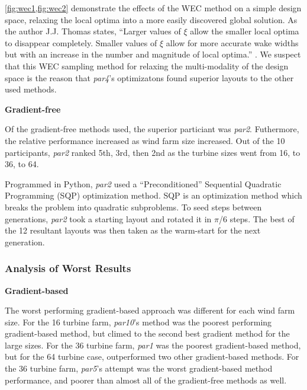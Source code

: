 	\cref{fig:wec1,fig:wec2} demonstrate the effects of the WEC method on a simple design space, relaxing the local optima into a more easily discovered global solution.
	As the author J.J. Thomas states, ``Larger values of $\xi$ allow the smaller local optima to disappear completely.
	Smaller values of $\xi$ allow for more accurate wake widths but with an increase in the number and magnitude of local optima.'' \cite{Thomas2018}.
	We suspect that this WEC sampling method for relaxing the multi-modality of the design space is the reason that \textit{par4}'s optimizatons found superior layouts to the other used methods.

	\vspace{3mm}
	\noindent\textbf{Gradient-free}\newline

	Of the gradient-free methods used, the superior particiant was \textit{par2}.
	Futhermore, the relative performance increased as wind farm size increased.
	Out of the 10 participants, \textit{par2} ranked 5th, 3rd, then 2nd as the turbine sizes went from 16, to 36, to 64.
	
	Programmed in Python, \textit{par2} used a ``Preconditioned'' Sequential Quadratic Programming (SQP) optimization method.
	SQP is an optimization method which breaks the problem into quadratic subproblems.
	To seed steps between generations, \textit{par2} took a starting layout and rotated it in $\pi$/6 steps.
	The best of the 12 resultant layouts was then taken as the warm-start for the next generation.



\subsubsection{Analysis of Worst Results}
	\vspace{3mm}
	\noindent\textbf{Gradient-based}\newline
	
	The worst performing gradient-based approach was different for each wind farm size.
	For the 16 turbine farm, \textit{par10}'s method was the poorest performing gradient-based method, but climed to the second best gradient method for the large sizes.
	For the 36 turbine farm, \textit{par1} was the poorest gradient-based method, but for the 64 turbine case, outperformed two other gradient-based methods.
	For the 36 turbine farm, \textit{par5}'s attempt was the worst gradient-based method performance, and poorer than almost all of the gradient-free methods as well.

